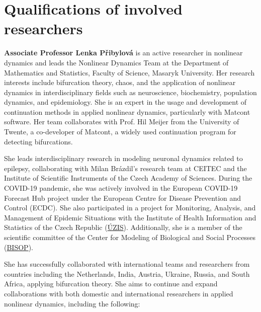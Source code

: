 \documentclass[a4paper,11pt]{scrartcl}
\begin{document}

\section{Qualifications of involved researchers}\label{sec:qualifications}




\textbf{Associate Professor Lenka Přibylová} is an active researcher in nonlinear dynamics and leads the Nonlinear Dynamics Team at the Department of Mathematics and Statistics, Faculty of Science, Masaryk University. Her research interests include bifurcation theory, chaos, and the application of nonlinear dynamics in interdisciplinary fields such as neuroscience, biochemistry, population dynamics, and epidemiology. She is an expert in the usage and development of continuation methods in applied nonlinear dynamics, particularly with Matcont software. Her team collaborates with Prof. Hil Meijer from the University of Twente, a co-developer of Matcont, a widely used continuation program for detecting bifurcations.

She leads interdisciplinary research in modeling neuronal dynamics related to epilepsy, collaborating with Milan Brázdil's research team at CEITEC and the Institute of Scientific Instruments of the Czech Academy of Sciences. During the COVID-19 pandemic, she was actively involved in the European COVID-19 Forecast Hub project under the European Centre for Disease Prevention and Control (ECDC). She also participated in a project for Monitoring, Analysis, and Management of Epidemic Situations with the Institute of Health Information and Statistics of the Czech Republic (\href{https://www.uzis.cz/}{ÚZIS}). Additionally, she is a member of the scientific committee of the Center for Modeling of Biological and Social Processes (\href{https://www.bisop.eu/}{BISOP}).

She has successfully collaborated with international teams and researchers from countries including the Netherlands, India, Austria, Ukraine, Russia, and South Africa, applying bifurcation theory. She aims to continue and expand collaborations with both domestic and international researchers in applied nonlinear dynamics, including the following:
\end{document}
